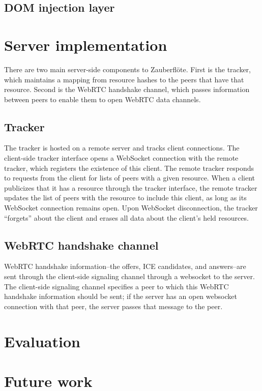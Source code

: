 \documentclass[letterpaper,twocolumn,10pt]{article}
\newcommand{\zbf}{Zauberfl\"{o}te\xspace}
\begin{document}
\subsection{DOM injection layer}

\section{Server implementation}

There are two main server-side components to \zbf. First is the tracker,
which maintains a mapping from resource hashes to the peers that have that
resource. Second is the WebRTC handshake channel, which passes information
between peers to enable them to open WebRTC data channels.

\subsection{Tracker}
The tracker is hosted on a remote server and tracks client connections.
The client-side tracker interface  opens a WebSocket connection with the remote tracker,
which registers the existence of this client. The remote tracker responds to
requests from the client for lists of peers with a given resource. When a client
publicizes that it has a resource through the tracker interface, the remote tracker updates
the list of peers with the resource to include this client, as
long as its WebSocket connection remains open. Upon WebSocket disconnection,
the tracker ``forgets'' about the client and erases all data about the client's
held resources.

\subsection{WebRTC handshake channel}

WebRTC handshake information--the offers, ICE candidates, and answers--are
sent through the client-side signaling channel through a websocket to
the server. The client-side signaling channel specifies a peer to which
this WebRTC handshake information should be sent; if the server has an open
websocket connection with that peer, the server passes that message to the peer.

\section{Evaluation}


\section{Future work}
\end{document}
